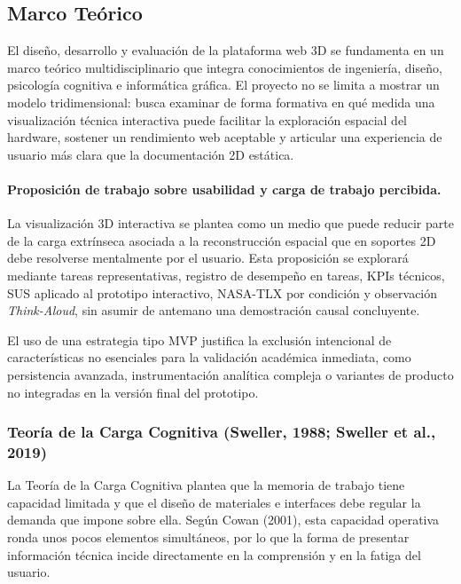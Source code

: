 \subsection{Marco Te\'orico}

El dise\~no, desarrollo y evaluaci\'on de la plataforma web 3D se fundamenta en un marco te\'orico multidisciplinario que integra conocimientos de ingenier\'ia, dise\~no, psicolog\'ia cognitiva e inform\'atica gr\'afica. El proyecto no se limita a mostrar un modelo tridimensional: busca examinar de forma formativa en qu\'e medida una visualizaci\'on t\'ecnica interactiva puede facilitar la exploraci\'on espacial del hardware, sostener un rendimiento web aceptable y articular una experiencia de usuario m\'as clara que la documentaci\'on 2D est\'atica.

\paragraph{Proposici\'on de trabajo sobre usabilidad y carga de trabajo percibida.} La visualizaci\'on 3D interactiva se plantea como un medio que puede reducir parte de la carga extr\'inseca asociada a la reconstrucci\'on espacial que en soportes 2D debe resolverse mentalmente por el usuario. Esta proposici\'on se explorar\'a mediante tareas representativas, registro de desempe\~no en tareas, KPIs t\'ecnicos, SUS aplicado al prototipo interactivo, NASA-TLX por condici\'on y observaci\'on \textit{Think-Aloud}, sin asumir de antemano una demostraci\'on causal concluyente.

El uso de una estrategia tipo MVP justifica la exclusi\'on intencional de caracter\'isticas no esenciales para la validaci\'on acad\'emica inmediata, como persistencia avanzada, instrumentaci\'on anal\'itica compleja o variantes de producto no integradas en la versi\'on final del prototipo.

\subsubsection{Teor\'ia de la Carga Cognitiva (Sweller, 1988; Sweller et al., 2019)}

La Teor\'ia de la Carga Cognitiva plantea que la memoria de trabajo tiene capacidad limitada y que el dise\~no de materiales e interfaces debe regular la demanda que impone sobre ella. Seg\'un Cowan (2001), esta capacidad operativa ronda unos pocos elementos simult\'aneos, por lo que la forma de presentar informaci\'on t\'ecnica incide directamente en la comprensi\'on y en la fatiga del usuario.

